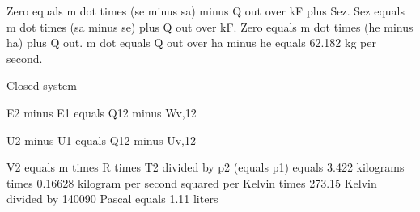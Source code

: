 Zero equals m dot times (se minus sa) minus Q out over kF plus Sez.  
Sez equals m dot times (sa minus se) plus Q out over kF.  
Zero equals m dot times (he minus ha) plus Q out.  
m dot equals Q out over ha minus he equals 62.182 kg per second.

Closed system

E2 minus E1 equals Q12 minus Wv,12

U2 minus U1 equals Q12 minus Uv,12

V2 equals m times R times T2 divided by p2 (equals p1) equals 3.422 kilograms times 0.16628 kilogram per second squared per Kelvin times 273.15 Kelvin divided by 140090 Pascal equals 1.11 liters